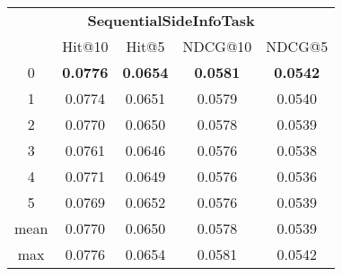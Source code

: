 \documentclass{article}
\begin{document}
 

\begin{tabular}{c|cccc}

\multicolumn{5}{c}{\textbf{SequentialSideInfoTask}} \\
\noalign{\smallskip}
\noalign{\smallskip}
\toprule
\multicolumn{1}{c}{Template ID} & \multicolumn{1}{|c}{Hit@10} & \multicolumn{1}{c}{Hit@5} & \multicolumn{1}{c}{NDCG@10} & \multicolumn{1}{c}{NDCG@5} \\
\midrule
0 & \textbf{0.0776} & \textbf{0.0654} & \textbf{0.0581} & \textbf{0.0542} \\
1 & 0.0774 & 0.0651 & 0.0579 & 0.0540 \\
2 & 0.0770 & 0.0650 & 0.0578 & 0.0539 \\
3 & 0.0761 & 0.0646 & 0.0576 & 0.0538 \\
4 & 0.0771 & 0.0649 & 0.0576 & 0.0536 \\
5 & 0.0769 & 0.0652 & 0.0576 & 0.0539 \\
\midrule
mean & 0.0770 & 0.0650 & 0.0578 & 0.0539 \\
max & 0.0776 & 0.0654 & 0.0581 & 0.0542 \\
\bottomrule

\end{tabular}
\end{document}
